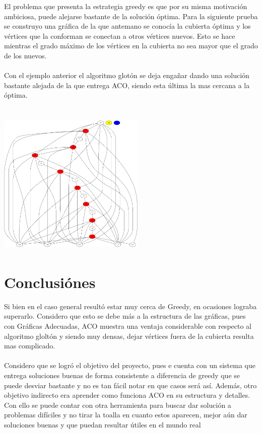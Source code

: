 \documentclass[oneside,12pt]{article}
\begin{document}
El problema que presenta la estrategia greedy es que por su misma motivación ambiciosa, puede alejarse bastante de la solución óptima. Para la siguiente prueba se construyo una gráfica de la que antemano se conocía la cubierta óptima y los vértices que la conforman se conectan a otros vértices nuevos. Esto se hace mientras el grado máximo de los vértices en la cubierta no sea mayor que el grado de los nuevos.\\\\
Con el ejemplo anterior el algoritmo glotón se deja engañar dando una solución bastante alejada de la que entrega ACO, siendo esta última la mas cercana a la óptima.\\\\

\begin{center}
\includegraphics[width=7cm, height=7cm]{grafica_truco}
\end{center}

\section{Conclusiónes}
Si bien en el caso general resultó estar muy cerca de Greedy, en ocasiones lograba superarlo. Considero que esto se debe más a la estructura de las gráficas, pues con Gráficas Adecuadas, ACO muestra una ventaja considerable con respecto al algoritmo gloltón y siendo muy densas, dejar vértices fuera de la cubierta resulta mas complicado.\\\\

Considero que se logró el objetivo del proyecto, pues e cuenta con un sistema que entrega soluciones buenas de forma consistente a diferencia de greedy que se puede desviar bastante y no es tan fácil notar en que casos será así. Además, otro objetivo indirecto era aprender como funciona ACO en su estructura y detalles. Con ello se puede contar con otra herramienta para buscar dar solución a problemas difíciles y no tirar la toalla en cuanto estos aparecen, mejor aún dar soluciones buenas y que puedan resultar útiles en el mundo real
\end{document}
